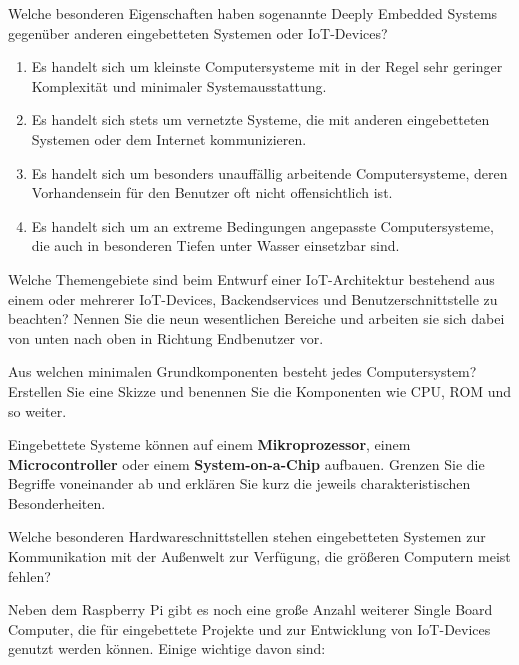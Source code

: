 \teilaufgabe
Welche besonderen Eigenschaften haben sogenannte \glqq Deeply Embedded Systems\grqq{}
gegenüber anderen eingebetteten Systemen oder IoT-Devices?

\begin{enumerate}
    \item Es handelt sich um kleinste Computersysteme mit in der Regel sehr
    geringer Komplexität und minimaler Systemausstattung.

    \item Es handelt sich stets um vernetzte Systeme, die mit anderen eingebetteten
    Systemen oder dem Internet kommunizieren.

    \item Es handelt sich um besonders unauffällig arbeitende Computersysteme,
    deren Vorhandensein für den Benutzer oft nicht offensichtlich ist.

    \item Es handelt sich um an extreme Bedingungen angepasste Computersysteme,
    die auch in besonderen Tiefen unter Wasser einsetzbar sind.
\end{enumerate}

\teilaufgabe
Welche Themengebiete sind beim Entwurf einer IoT-Architektur bestehend aus einem
oder mehrerer IoT-Devices, Backendservices und Benutzerschnittstelle zu beachten?
Nennen Sie die neun wesentlichen Bereiche und arbeiten sie sich dabei von unten
nach oben in Richtung Endbenutzer vor.

\bigskip
\teilaufgabe
Aus welchen minimalen Grundkomponenten besteht jedes Computersystem? Erstellen
Sie eine Skizze und benennen Sie die Komponenten wie CPU, ROM und so weiter.

\bigskip
\teilaufgabe
Eingebettete Systeme können auf einem \textbf{Mikroprozessor},
einem \textbf{Microcontroller} oder einem \textbf{System-on-a-Chip} aufbauen.
Grenzen Sie die Begriffe voneinander ab und erklären Sie kurz die jeweils
charakteristischen Besonderheiten.

\bigskip
\teilaufgabe
Welche besonderen Hardwareschnittstellen stehen eingebetteten Systemen zur
Kommunikation mit der Außenwelt zur Verfügung, die größeren Computern meist
fehlen?

\clearpage

Neben dem Raspberry Pi gibt es noch eine große Anzahl weiterer Single Board
Computer, die für eingebettete Projekte und zur Entwicklung von IoT-Devices
genutzt werden können. Einige wichtige davon sind:


